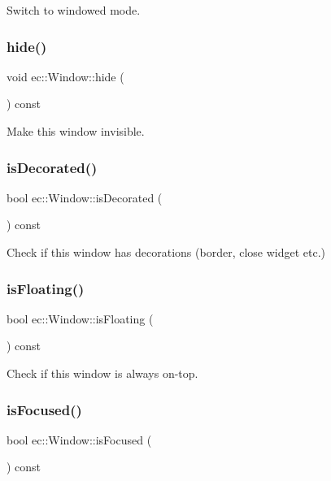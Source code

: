 Switch to windowed mode. \mbox{\label{classec_1_1_window_ae03af70ef60b666e60533ede07fad8cf}} 
\subsubsection{\texorpdfstring{hide()}{hide()}}
{\footnotesize\ttfamily void ec\+::\+Window\+::hide (\begin{DoxyParamCaption}{ }\end{DoxyParamCaption}) const}

Make this window invisible. \mbox{\label{classec_1_1_window_a2761ae9079a18f5d62b2ed4715fd9bd1}} 
\subsubsection{\texorpdfstring{is\+Decorated()}{isDecorated()}}
{\footnotesize\ttfamily bool ec\+::\+Window\+::is\+Decorated (\begin{DoxyParamCaption}{ }\end{DoxyParamCaption}) const}

Check if this window has decorations (border, close widget etc.) \mbox{\label{classec_1_1_window_a8e0c04a4c922d351246af64a5d439ba3}} 
\subsubsection{\texorpdfstring{is\+Floating()}{isFloating()}}
{\footnotesize\ttfamily bool ec\+::\+Window\+::is\+Floating (\begin{DoxyParamCaption}{ }\end{DoxyParamCaption}) const}

Check if this window is always on-\/top. \mbox{\label{classec_1_1_window_ac40c6391e9edd720407f8a77d4ee546a}} 
\subsubsection{\texorpdfstring{is\+Focused()}{isFocused()}}
{\footnotesize\ttfamily bool ec\+::\+Window\+::is\+Focused (\begin{DoxyParamCaption}{ }\end{DoxyParamCaption}) const}

